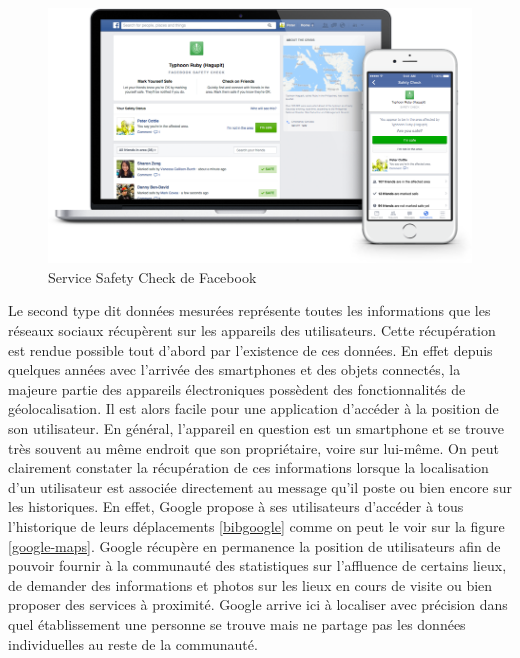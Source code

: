 \begin{figure}[H]
    \centering
    \includegraphics[width=\textwidth]{./img/safetycheck.png}
    \caption{Service Safety Check de Facebook}
    \label{safety-check}
\end{figure}

Le second type dit données mesurées représente toutes les informations que les réseaux sociaux récupèrent sur les appareils des utilisateurs. Cette récupération est rendue possible tout d’abord par l’existence de ces données. En effet depuis quelques années avec l’arrivée des smartphones et des objets connectés, la majeure partie des appareils électroniques possèdent des fonctionnalités de géolocalisation. Il est alors facile pour une application d’accéder à la position de son utilisateur. En général, l’appareil en question est un smartphone et se trouve très souvent au même endroit que son propriétaire, voire sur lui-même. On peut clairement constater la récupération de ces informations lorsque la localisation d’un utilisateur est associée directement au message qu’il poste ou bien encore sur les historiques. En effet, Google propose à ses utilisateurs d’accéder à tous l’historique de leurs déplacements \ref{bibgoogle} comme on peut le voir sur la figure \ref{google-maps}. Google récupère en permanence la position de utilisateurs afin de pouvoir fournir à la communauté des statistiques sur l’affluence de certains lieux, de demander des informations et photos sur les lieux en cours de visite ou bien proposer des services à proximité. Google arrive ici à localiser avec précision dans quel établissement une personne se trouve mais ne partage pas les données individuelles au reste de la communauté.

